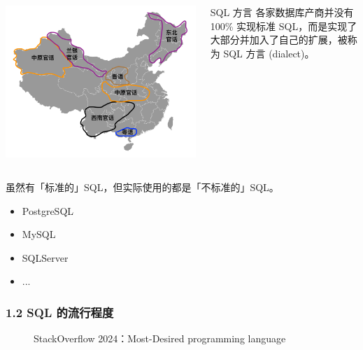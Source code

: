\documentclass[aspectratio=169, 14pt]{beamer}
\begin{document}
\begin{frame}

	\begin{columns}
		\includegraphics[width=\textwidth]{week3/china}
		\begin{block}{SQL 方言}
			各家数据库产商并没有 100\% 实现标准 SQL，而是实现了大部分并加入了自己的扩展，被称为 \alert{SQL 方言} (dialect)。
		\end{block}
	\end{columns}

	虽然有「标准的」SQL，但实际使用的都是「不标准的」SQL。

	\begin{itemize}
		\item PostgreSQL
		\item MySQL
		\item SQLServer
		\item ...
	\end{itemize}
\end{frame}

\begin{frame}[fragile]
	\frametitle{1.2 SQL 的流行程度}
	\begin{figure}
		\caption*{StackOverflow 2024：Most-Desired programming language}
	\end{figure}
\end{frame}
\end{document}

